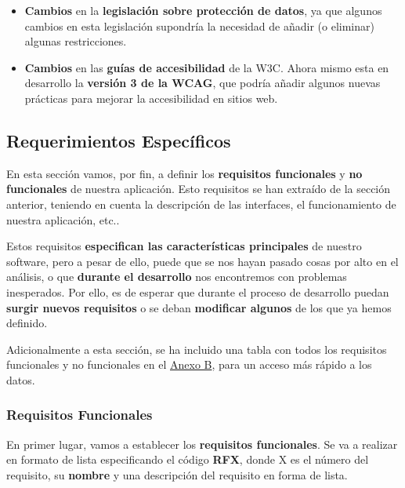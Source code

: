 \begin{itemize}
	\item \textbf{Cambios} en la \textbf{legislación sobre protección de datos}, ya que algunos cambios en esta legislación supondría la necesidad de añadir (o eliminar) algunas restricciones.
	
	\item \textbf{Cambios} en las \textbf{guías de accesibilidad} de la W3C. Ahora mismo esta en desarrollo la \textbf{versión 3 de la WCAG}, que podría añadir algunos nuevas prácticas para mejorar la accesibilidad en sitios web.
\end{itemize}


\subsection{Requerimientos Específicos}
En esta sección vamos, por fin, a definir los \textbf{requisitos funcionales} y \textbf{no funcionales} de nuestra aplicación. Esto requisitos se han extraído de la sección anterior, teniendo en cuenta la descripción de las interfaces, el funcionamiento de nuestra aplicación, etc..

Estos requisitos \textbf{especifican las características principales} de nuestro software, pero a pesar de ello, puede que se nos hayan pasado cosas por alto en el análisis, o que \textbf{durante el desarrollo} nos encontremos con problemas inesperados. Por ello, es de esperar que durante el proceso de desarrollo puedan \textbf{surgir nuevos requisitos} o se deban \textbf{modificar algunos} de los que ya hemos definido.

Adicionalmente a esta sección, se ha incluido una tabla con todos los requisitos funcionales y no funcionales en el  \hyperref[sec:apenB]{Anexo B}, para un acceso más rápido a los datos.

\subsubsection{Requisitos Funcionales}
En primer lugar, vamos a establecer los \textbf{requisitos funcionales}. Se va a realizar en formato de lista especificando el código \textbf{RFX}, donde X es el número del requisito, su \textbf{nombre} y una descripción del requisito en forma de lista. 

